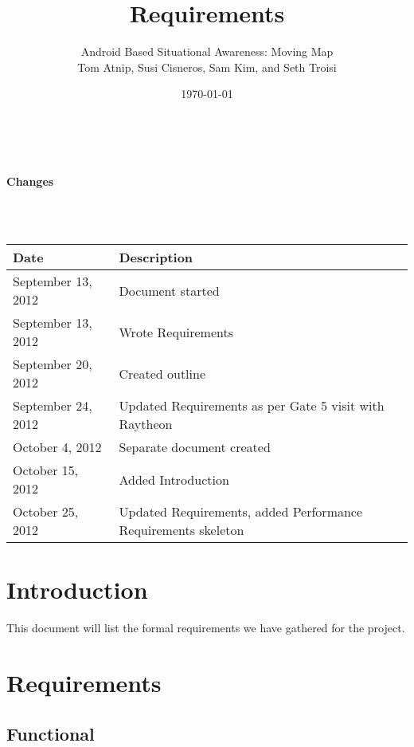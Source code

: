 \documentclass{article}
\begin{document}
\setlength{\voffset}{3.5in}
\title{Requirements}
\author{\Large Android Based Situational Awareness: Moving Map\\
Tom Atnip, Susi Cisneros, Sam Kim, and Seth Troisi}
\date{\today}
\maketitle
\clearpage
\setlength{\voffset}{0pt}
\tableofcontents
\clearpage
~\\
\begin{Large}\textbf{Changes}\end{Large}\\
~\\
\begin{tabular}{ | p{1.5in} | p{4.5in} | }
\hline
\textbf{Date} & \textbf{Description}\\
\hline
\hline
September 13, 2012 & Document started\\
\hline
September 13, 2012 & Wrote Requirements\\
\hline
September 20, 2012 & Created outline\\
\hline
September 24, 2012 & Updated Requirements as per Gate 5 visit with Raytheon\\
\hline
October 4, 2012 & Separate document created\\
\hline
October 15, 2012 & Added Introduction\\
\hline
October 25, 2012 & Updated Requirements, added Performance Requirements skeleton\\
\hline
\end{tabular}
\clearpage

\section{Introduction}
This document will list the formal requirements we have gathered for the project.


\section{Requirements}

\subsection{Functional}
\end{document}
